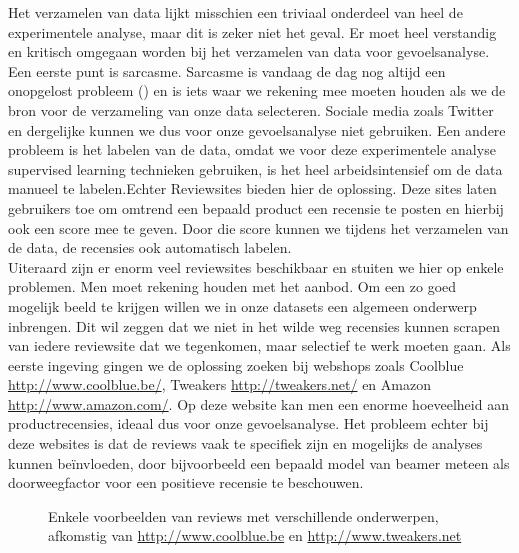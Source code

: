 Het verzamelen van data lijkt misschien een triviaal onderdeel van heel de experimentele analyse, maar dit is zeker niet het geval. Er moet heel verstandig en kritisch omgegaan worden bij het verzamelen van data voor gevoelsanalyse. Een eerste punt is sarcasme. Sarcasme is vandaag de dag nog altijd een onopgelost probleem (\cite{liebrecht2013perfect}) en is iets waar we rekening mee moeten houden als we de bron voor de verzameling van onze data selecteren. Sociale media zoals Twitter en dergelijke kunnen we dus voor onze gevoelsanalyse niet gebruiken. Een andere probleem is het labelen van de data, omdat we voor deze experimentele analyse supervised learning technieken gebruiken, is het heel arbeidsintensief om de data manueel te labelen.Echter Reviewsites bieden hier de oplossing. Deze sites laten gebruikers toe om omtrend een bepaald product een recensie te posten en hierbij ook een score mee te geven. Door die score kunnen we tijdens het verzamelen van de data, de recensies ook automatisch labelen.\\

Uiteraard zijn er enorm veel reviewsites beschikbaar en stuiten we hier op enkele problemen. Men moet rekening houden met het aanbod. Om een zo goed mogelijk beeld te krijgen willen we in onze datasets een algemeen onderwerp inbrengen. Dit wil zeggen dat we niet in het wilde weg recensies kunnen scrapen van iedere reviewsite dat we tegenkomen, maar selectief te werk moeten gaan. Als eerste ingeving gingen we de oplossing zoeken bij webshops zoals Coolblue \url{http://www.coolblue.be/}, Tweakers \url{http://tweakers.net/} en Amazon \url{http://www.amazon.com/}. Op deze website kan men een enorme hoeveelheid aan productrecensies, ideaal dus voor onze gevoelsanalyse. Het probleem echter bij deze websites is dat de reviews vaak te specifiek zijn en mogelijks de analyses kunnen be\"invloeden, door bijvoorbeeld een bepaald model van beamer meteen als doorweegfactor voor een positieve recensie te beschouwen.

\begin{figure}%
    \centering
    \caption{Enkele voorbeelden van reviews met verschillende onderwerpen, afkomstig van \url{http://www.coolblue.be} en \url{http://www.tweakers.net} }%
\end{figure}

